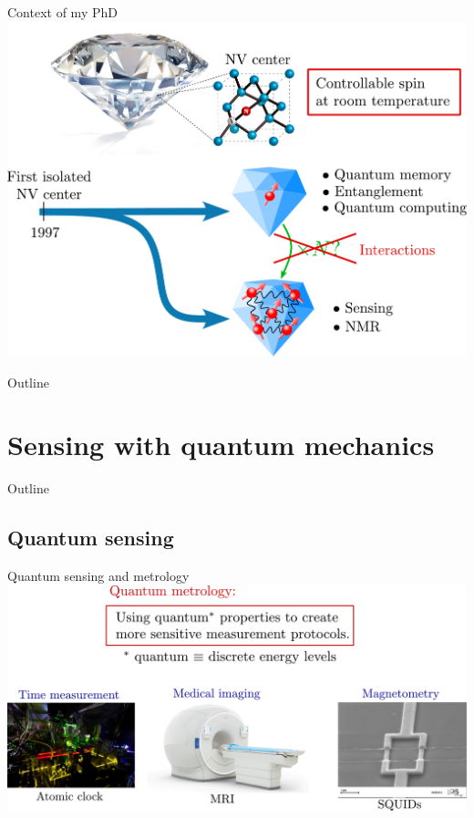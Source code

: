 \documentclass{beamer}
\begin{document}
\begin{frame}{Context of my PhD}
\centering
\includegraphics[width=\textwidth,height=0.85\textheight,keepaspectratio]{Slide_contexte_f}
\end{frame}

\begin{frame}{Outline}
\tableofcontents
\end{frame}

\section{Sensing with quantum mechanics}
\begin{frame}{Outline}
\tableofcontents[currentsection]
\end{frame}

\subsection{Quantum sensing}
\begin{frame}{Quantum sensing and metrology}
\centering
\includegraphics[width=\textwidth,height=0.85\textheight,keepaspectratio]{Slide_quantum_metrology}
\end{frame}
\end{document}

